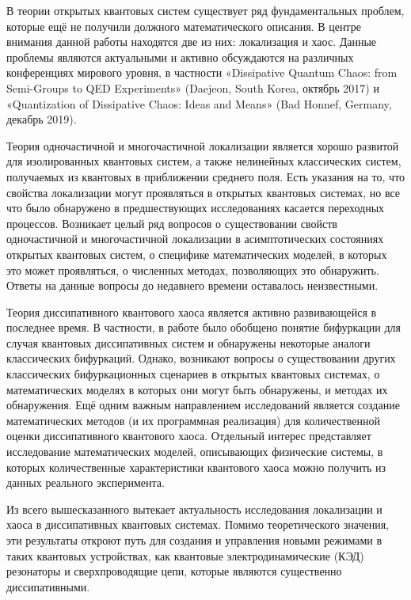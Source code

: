 В теории открытых квантовых систем существует ряд фундаментальных проблем, которые ещё не получили должного математического описания.
В центре внимания данной работы находятся две из них: локализация и хаос.
Данные проблемы являются актуальными и активно обсуждаются на различных конференциях мирового уровня, в частности «Dissipative Quantum Chaos: from Semi-Groups to QED Experiments» (Daejeon, South Korea, октябрь 2017) и «Quantization of Dissipative Chaos: Ideas and Means» (Bad Honnef, Germany, декабрь 2019).

Теория одночастичной и многочастичной локализации является хорошо развитой для изолированных квантовых систем, а также нелинейных классических систем, получаемых из квантовых в приближении среднего поля.
Есть указания на то, что свойства локализации могут проявляться в открытых квантовых системах, но все что было обнаружено в предшествующих исследованиях касается переходных процессов\autocite{Genway2014}.
Возникает целый ряд вопросов о существовании свойств одночастичной и многочастичной локализации в асимптотических состояниях открытых квантовых систем, о специфике математических моделей, в которых это может проявляться, о численных методах, позволяющих это обнаружить. 
Ответы на данные вопросы до недавнего времени оставалось неизвестными.

Теория диссипативного квантового хаоса является активно развивающейся в последнее время.
В частности, в работе \autocite{Hartmann2017, Ivanchenko2017} было обобщено понятие бифуркации для случая квантовых диссипативных систем и обнаружены некоторые аналоги классических бифуркаций.
Однако, возникают вопросы о существовании других классических бифуркационных сценариев в открытых квантовых системах, о математических моделях в которых они могут быть обнаружены, и методах их обнаружения.
Ещё одним важным направлением исследований является создание математических методов (и их программная реализация) для количественной оценки диссипативного квантового хаоса.
Отдельный интерес представляет исследование математических моделей, описывающих физические системы, в которых количественные характеристики квантового хаоса можно получить из данных реального эксперимента.

Из всего вышесказанного вытекает актуальность исследования локализации и хаоса в диссипативных квантовых системах. Помимо теоретического значения, эти результаты откроют путь для создания и управления новыми режимами в таких квантовых устройствах, как квантовые электродинамические (КЭД) резонаторы \autocite{Imamoglu1999, Walther2006, Arakawa2015} и сверхпроводящие цепи, которые являются существенно диссипативными.

